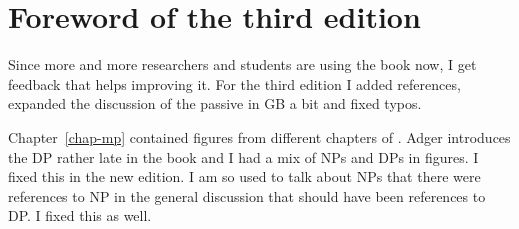
\section*{Foreword of the third edition}










Since more and more researchers and students are using the book now, I get feedback that helps
improving it. For the third edition I added references, expanded the discussion of the passive in GB
a bit and fixed typos.

Chapter~\ref{chap-mp} contained figures from different chapters of . Adger
introduces the DP rather late in the book and I had a mix of NPs and DPs in figures. I fixed this in
the new edition. I am so used to talk about NPs that there were references to NP in the general
discussion that should have been references to DP. I fixed this as well.

